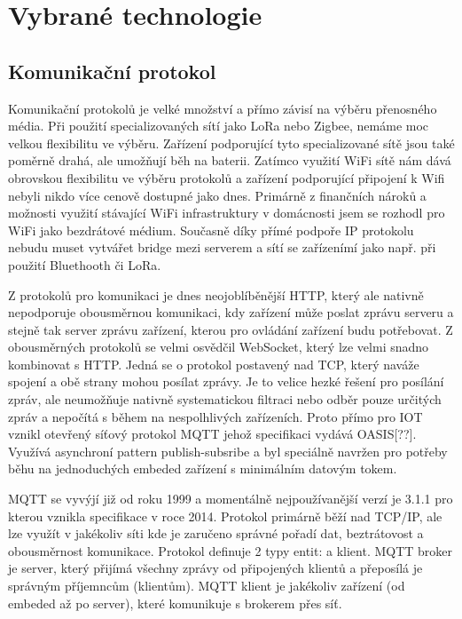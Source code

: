 \documentclass[thesis=B,czech]{FITthesis}[2019/12/23]
\begin{document}
\section{Vybrané technologie}

\subsection{Komunikační protokol}   %
Komunikační protokolů je velké množství a přímo závisí na výběru přenosného média. Při použití specializovaných sítí jako LoRa nebo Zigbee, nemáme moc velkou flexibilitu ve výběru. Zařízení podporující tyto specializované sítě jsou také poměrně drahá, ale umožňují běh na baterii. Zatímco využití WiFi sítě nám dává obrovskou flexibilitu ve výběru protokolů a zařízení podporující připojení k Wifi nebyli nikdo více cenově dostupné jako dnes. Primárně z finančních nároků a možnosti využití stávající WiFi infrastruktury v domácnosti jsem se rozhodl pro WiFi jako bezdrátové médium. Současně díky přímé podpoře IP protokolu nebudu muset vytvářet bridge mezi serverem a sítí se zařízenímí jako např. při použití Bluethooth či LoRa.

Z protokolů pro komunikaci je dnes neojoblíběnější HTTP, který ale nativně nepodporuje obousměrnou komunikaci, kdy zařízení může poslat zprávu serveru a stejně tak server zprávu zařízení, kterou pro ovládání zařízení budu potřebovat. Z obousměrných protokolů se velmi osvědčil WebSocket, který lze velmi snadno kombinovat s HTTP. Jedná se o protokol postavený nad TCP, který naváže spojení a obě strany mohou posílat zprávy. Je to velice hezké řešení pro posílání zpráv, ale neumožňuje nativně systematickou filtraci nebo odběr pouze určitých zpráv a nepočítá s během na nespolhlivých zařízeních. Proto přímo pro IOT vznikl otevřený síťový protokol MQTT jehož specifikaci vydává OASIS[??]. Využívá asynchroní pattern publish-subsribe a byl speciálně navržen pro potřeby běhu na jednoduchých embeded zařízení s minimálním datovým tokem.

MQTT se vyvýjí již od roku 1999 a momentálně nejpoužívanější verzí je 3.1.1 pro kterou vznikla specifikace v roce 2014. Protokol primárně běží nad TCP/IP, ale lze využít v jakékoliv síti kde je zaručeno správné pořadí dat, beztrátovost a obousměrnost komunikace. Protokol definuje 2 typy entit:  a klient. MQTT broker je server, který přijímá všechny zprávy od připojených klientů a přeposílá je správným příjemncům (klientům). MQTT klient je jakékoliv zařízení (od embeded až po server), které komunikuje s brokerem přes síť.
\end{document}
